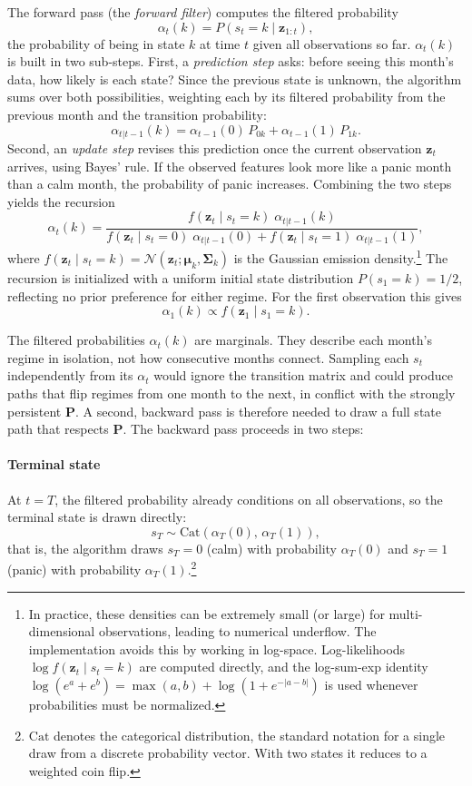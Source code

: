 The forward pass (the \emph{forward filter}) computes the filtered probability
\[
\alpha_t(k) = P(s_t = k \mid \mathbf{z}_{1:t}),
\]
the probability of being in state $k$ at time $t$ given all observations so far. $\alpha_t(k)$ is built in two sub-steps. First, a \emph{prediction step} asks: before seeing this month's data, how likely is each state? Since the previous state is unknown, the algorithm sums over both possibilities, weighting each by its filtered probability from the previous month and the transition probability:
\[
\alpha_{t|t-1}(k) = \alpha_{t-1}(0)\,P_{0k} + \alpha_{t-1}(1)\,P_{1k}.
\]
Second, an \emph{update step} revises this prediction once the current observation $\mathbf{z}_t$ arrives, using Bayes' rule. If the observed features look more like a panic month than a calm month, the probability of panic increases. Combining the two steps yields the recursion
\begin{equation}
\alpha_t(k)
=
\frac{f(\mathbf{z}_t \mid s_t=k)\;\alpha_{t|t-1}(k)}
     {f(\mathbf{z}_t \mid s_t=0)\;\alpha_{t|t-1}(0) + f(\mathbf{z}_t \mid s_t=1)\;\alpha_{t|t-1}(1)},
\label{eq:forward_plain}
\end{equation}
where $f(\mathbf{z}_t \mid s_t=k) = \mathcal{N}(\mathbf{z}_t;\boldsymbol{\mu}_k,\boldsymbol{\Sigma}_k)$ is the Gaussian emission density.\footnote{In practice, these densities can be extremely small (or large) for multi-dimensional observations, leading to numerical underflow. The implementation avoids this by working in log-space. Log-likelihoods $\log f(\mathbf{z}_t \mid s_t = k)$ are computed directly, and the log-sum-exp identity $\log(e^a + e^b) = \max(a,b) + \log(1 + e^{-|a-b|})$ is used whenever probabilities must be normalized.} The recursion is initialized with a uniform initial state distribution $P(s_1 = k) = 1/2$, reflecting no prior preference for either regime. For the first observation this gives
\[
\alpha_1(k) \propto f(\mathbf{z}_1 \mid s_1 = k).
\]

The filtered probabilities $\alpha_t(k)$ are marginals. They describe each month's regime in isolation, not how consecutive months connect. Sampling each $s_t$ independently from its $\alpha_t$ would ignore the transition matrix and could produce paths that flip regimes from one month to the next, in conflict with the strongly persistent $\mathbf{P}$. A second, backward pass is therefore needed to draw a full state path that respects $\mathbf{P}$. The backward pass proceeds in two steps:

\paragraph{Terminal state} At $t = T$, the filtered probability already conditions on all observations, so the terminal state is drawn directly:
\[
s_T \sim \text{Cat}(\alpha_T(0),\, \alpha_T(1)),
\]
that is, the algorithm draws $s_T = 0$ (calm) with probability $\alpha_T(0)$ and $s_T = 1$ (panic) with probability $\alpha_T(1)$.\footnote{$\text{Cat}$ denotes the categorical distribution, the standard notation for a single draw from a discrete probability vector. With two states it reduces to a weighted coin flip.}

